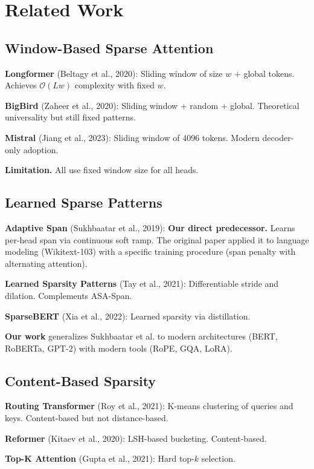 
\section{Related Work}

\subsection{Window-Based Sparse Attention}

\textbf{Longformer} (Beltagy et al., 2020): Sliding window of size $w$ + global 
tokens. Achieves $\mathcal{O}(L w)$ complexity with fixed $w$.

\textbf{BigBird} (Zaheer et al., 2020): Sliding window + random + global. 
Theoretical universality but still fixed patterns.

\textbf{Mistral} (Jiang et al., 2023): Sliding window of 4096 tokens. Modern 
decoder-only adoption.

\textbf{Limitation.} All use fixed window size for all heads.

\subsection{Learned Sparse Patterns}

\textbf{Adaptive Span} (Sukhbaatar et al., 2019): \textbf{Our direct predecessor.} 
Learns per-head span via continuous soft ramp. The original paper applied 
it to language modeling (Wikitext-103) with a specific training procedure 
(span penalty with alternating attention).

\textbf{Learned Sparsity Patterns} (Tay et al., 2021): Differentiable stride 
and dilation. Complements ASA-Span.

\textbf{SparseBERT} (Xia et al., 2022): Learned sparsity via distillation.

\textbf{Our work} generalizes Sukhbaatar et al. to modern architectures (BERT, 
RoBERTa, GPT-2) with modern tools (RoPE, GQA, LoRA).

\subsection{Content-Based Sparsity}

\textbf{Routing Transformer} (Roy et al., 2021): K-means clustering of queries 
and keys. Content-based but not distance-based.

\textbf{Reformer} (Kitaev et al., 2020): LSH-based bucketing. Content-based.

\textbf{Top-K Attention} (Gupta et al., 2021): Hard top-$k$ selection.

